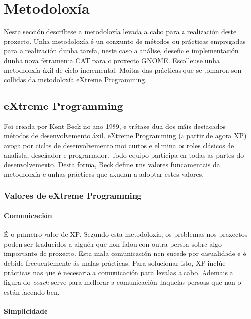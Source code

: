 \chapter{Metodoloxía}

Nesta sección descríbese a metodoloxía levada a cabo para a realización deste proxecto. Unha metodoloxía é un conxunto de métodos ou prácticas empregadas para a realización dunha tarefa, neste caso a análise, deseño e implementación dunha nova ferramenta CAT para o proxecto GNOME. Escolleuse unha metodoloxía áxil de ciclo incremental. Moitas das prácticas que se tomaron son collidas da metodoloxía eXtreme Programming.

\section{eXtreme Programming}

Foi creada por Kent Beck no ano 1999\cite{book:extremeprogramming}, e trátase dun dos máis destacados métodos de desenvolvemento áxil. eXtreme Programming (a partir de agora XP) avoga por ciclos de desenvolvemento moi curtos e elimina os roles clásicos de analista, deseñador e programador. Todo equipo participa en todas as partes do desenvolvemento. Desta forma, Beck define uns valores fundamentais da metodoloxía e unhas prácticas que axudan a adoptar estes valores.

\subsection{Valores de eXtreme Programming}

\subsubsection{Comunicación}
É o primeiro valor de XP. Segundo esta metodoloxía, os problemas nos proxectos poden ser traducidos a alguén que non falou con outra persoa sobre algo importante do proxecto. Esta mala comunicación non sucede por casualidade e é debido frecuentemente ás malas prácticas. Para solucionar isto, XP inclúe prácticas nas que é necesaria a comunicación para levalas a cabo. Ademais a figura do \emph{coach} serve para mellorar a comunicación daquelas persoas que non o están facendo ben.

\subsubsection{Simplicidade}

